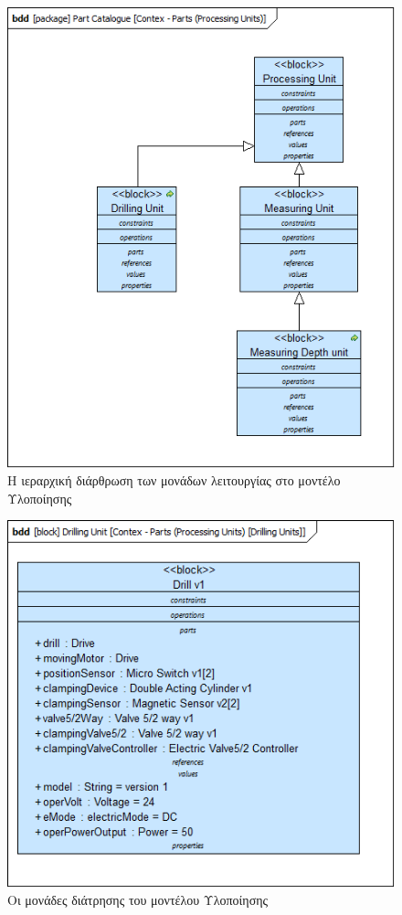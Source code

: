 \documentclass[a4paper,12pt,twoside]{report}
\begin{document}
\begin{appendices}
				\begin{figure}[hp]
					\centering
					\includegraphics[scale=0.50]{DesignModel_Contex-Parts(ProcessingUnits).png}
					\caption{Η ιεραρχική διάρθρωση των μονάδων λειτουργίας στο μοντέλο Υλοποίησης}
					\label{φωτ:Η ιεραρχική διάρθρωση των μονάδων λειτουργίας στο μοντέλο Υλοποίησης}
				\end{figure}
				
				\begin{figure}[hp]
					\centering
					\includegraphics[scale=0.50]{DesignModel_Contex-Parts(ProcessingUnits)[DrillingUnits].png}
					\caption{Οι μονάδες διάτρησης του μοντέλου Υλοποίησης}
					\label{φωτ:Οι μονάδες διάτρησης του μοντέλου Υλοποίησης}
				\end{figure}
				

\end{appendices}
\end{document}
